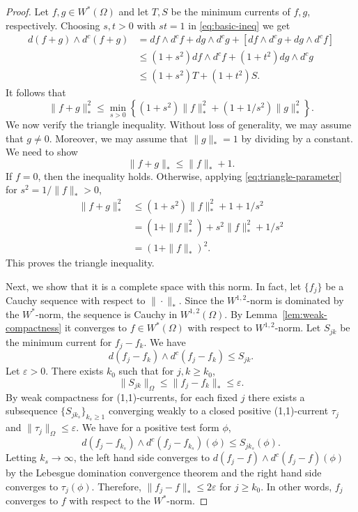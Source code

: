 \documentclass{amsart}
\newcommand{\veps}{\varepsilon}
\newcommand{\Om}{\Omega}
\theoremstyle{definition}
\numberwithin{thm}{section}
\numberwithin{equation}{section}
\renewcommand{\[}{\begin{equation}}
\renewcommand{\]}{\end{equation}}
\newcommand{\wed}{\wedge}
\begin{document}
\begin{proof} Let $f, g \in W^*(\Om)$ and let $T,  S$ be the minimum currents of $f, g$, respectively. Choosing $s,t >0$ with $st =1$ in \eqref{eq:basic-ineq} we get 
$$\begin{aligned}
	d(f+g)\wed d^c (f+g) 
&	= df \wed d^c f + dg \wed d^c g + [df\wed d^c g + dg\wed d^c f]  \\
&	\leq (1+ s^2) df \wed d^c f + (1+ t^2) dg \wed d^c g \\
&	\leq (1+ s^2) T + (1+t^2) S.
\end{aligned}$$
It follows that 
\[ \label{eq:triangle-parameter}
	\|f+g\|_*^2 \leq  \min_{s>0} \left\{ (1+ s^2) \|f\|_*^2 + (1+ 1/s^{2}) \|g\|_*^2\right\}.
\]
We now verify the triangle inequality. Without loss of generality,  we may assume that $g \neq 0$. Moreover,  we may assume that $\|g\|_* =1$ by dividing by a constant. We need to show
$$
	\|f+g\|_* \leq \|f\|_* +1.
$$
If $f =0$, then the inequality holds. Otherwise, 
applying \eqref{eq:triangle-parameter} for $s^2 = 1/ \|f\|_* >0$,
$$\begin{aligned}
	\|f+g\|_*^2
&	\leq  (1+s^2) \|f\|_*^2 + 1 + 1/s^2  \\
&	= (1+ \|f\|_*^2) + s^2 \|f\|_*^2 + 1/s^2 \\
&	= (1+ \|f\|_*)^2.
\end{aligned}$$
This proves the triangle inequality.

Next, we  show that it is a complete space with this norm. In fact, let $\{f_j\}$ be a Cauchy sequence with respect to $\|\cdot\|_*.$ Since the $W^{1,2}$-norm is dominated by the $W^*$-norm, the sequence is Cauchy in $W^{1,2}(\Om)$. By Lemma~\ref{lem:weak-compactness} it converges to $f \in W^*(\Om)$ with respect to $W^{1,2}$-norm. Let $S_{jk}$ be the minimum current for $f_j - f_k$. We have
$$
	d(f_j -f_k) \wed d^c (f_j - f_k) \leq S_{jk}.
$$
Let $\veps>0$. There exists $k_0$ such that for  $j, k \geq k_0$,
$$
	\|S_{jk} \|_{\Om} \leq \|f_j - f_k\|_* \leq \veps. 
$$
By weak compactness for (1,1)-currents, for each fixed $j$ there exists a subsequence $\{S_{j k_s}\}_{k_s\geq 1}$ converging weakly to  a closed positive (1,1)-current $\tau_j$ and $\|\tau_j\|_\Om \leq \veps$. 
We have for a positive test form $\phi$,
$$
	 d (f_j - f_{k_s}) \wed d^c (f_j - f_{k_s}) (\phi)   \leq S_{j k_s} (\phi).
$$
Letting $k_s\to \infty$, the left hand side  converges to $d(f_j - f) \wed d^c (f_j -f) (\phi)$ by the Lebesgue domination convergence theorem and the right hand side converges to $\tau_j(\phi)$. Therefore,
$ \| f_j - f\|_* \leq 2\veps$ for $j \geq k_0$. In other words, $f_j$ converges to $f$ with respect to the $W^*$-norm.
\end{proof}
\end{document}
